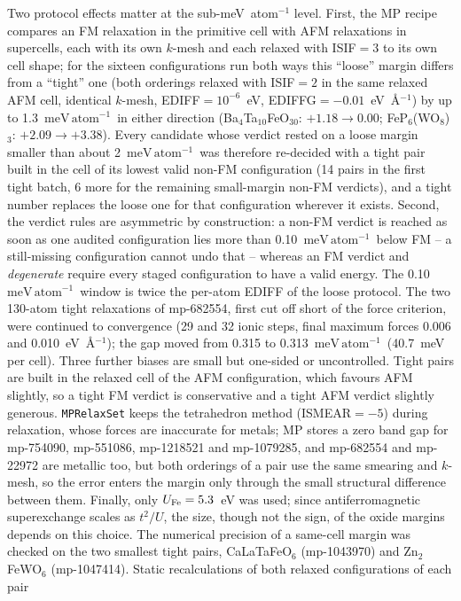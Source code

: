 \documentclass[aps,prb,preprint,superscriptaddress,longbibliography,nofootinbib]{revtex4-2}
\newcommand{\meVat}{\ensuremath{\mathrm{meV\,atom^{-1}}}}
\begin{document}
Two protocol effects matter at the sub-meV~atom$^{-1}$ level. First, the MP recipe compares an FM relaxation
in the primitive cell with AFM relaxations in supercells, each with its own $k$-mesh and each relaxed with
ISIF$=3$ to its own cell shape; for the sixteen configurations run both ways this ``loose'' margin differs from
a ``tight'' one (both orderings relaxed with ISIF$=2$ in the same relaxed AFM cell, identical $k$-mesh,
EDIFF$=10^{-6}$~eV, EDIFFG$=-0.01$~eV~\AA$^{-1}$) by up to 1.3~\meVat\ in either direction
(Ba$_4$Ta$_{10}$FeO$_{30}$: $+1.18\to0.00$; FeP$_6$(WO$_8$)$_3$: $+2.09\to+3.38$). Every candidate whose
verdict rested on a loose margin smaller than about 2~\meVat\ was therefore re-decided with a tight pair built
in the cell of its lowest valid non-FM configuration (14 pairs in the first tight batch, 6 more for the
remaining small-margin non-FM verdicts), and a tight number replaces the loose one for that configuration wherever
it exists. Second, the verdict rules are asymmetric by construction: a non-FM verdict is reached as soon as
one audited configuration lies more than 0.10~\meVat\ below FM -- a still-missing configuration cannot undo
that -- whereas an FM verdict and \emph{degenerate} require every staged configuration to have a valid
energy. The 0.10~\meVat\ window is twice the per-atom EDIFF of the loose protocol. The two 130-atom tight
relaxations of mp-682554, first cut off short of the force criterion, were continued to convergence (29 and
32 ionic steps, final maximum forces 0.006 and 0.010~eV~\AA$^{-1}$); the gap moved from 0.315 to
0.313~\meVat\ (40.7~meV per cell). Three further biases are small but one-sided or uncontrolled. Tight pairs are
built in the relaxed cell of the AFM configuration, which favours AFM slightly, so a tight FM verdict is
conservative and a tight AFM verdict slightly generous. \texttt{MPRelaxSet} keeps the tetrahedron method
(ISMEAR$=-5$) during relaxation, whose forces are inaccurate for metals; MP stores a zero band gap for mp-754090, mp-551086, mp-1218521 and mp-1079285, and mp-682554 and mp-22972
are metallic too, but
both orderings of a pair use the same smearing and $k$-mesh, so the error enters the margin only through the
small structural difference between them. Finally, only $U_{\rm Fe}=5.3$~eV was used; since antiferromagnetic
superexchange scales as $t^2/U$, the size, though not the sign, of the oxide margins depends on this choice.
The numerical precision of a same-cell margin was checked on the two smallest tight pairs, CaLaTaFeO$_6$
(mp-1043970) and Zn$_2$FeWO$_6$ (mp-1047414). Static recalculations of both relaxed configurations of each pair
\end{document}
